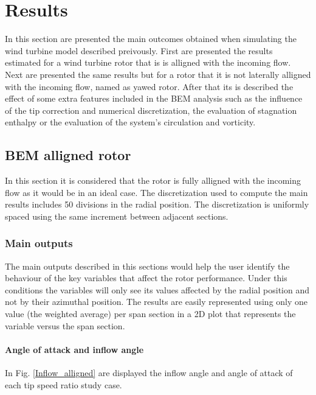 \chapter{Results}

In this section are presented the main outcomes obtained when simulating the wind turbine model described preivously.  First are presented the results estimated for a wind turbine rotor that is is alligned with the incoming flow. Next are presented the same results but for a rotor that it is not laterally alligned with the incoming flow, named as yawed rotor. After that its is described the effect of some extra features included in the BEM analysis such as the influence of the tip correction and numerical discretization, the evaluation of stagnation enthalpy or the evaluation of the system's circulation and vorticity.\\


\section{BEM alligned rotor}

In this section it is considered that the rotor is fully alligned with the incoming flow as it would be in an ideal case. The discretization used to compute the main results includes 50 divisions in the radial position. The discretization is uniformly spaced using the same increment between adjacent sections.  

\subsection{Main outputs }

The main outputs described in this sections would help the user identify the behaviour of the key variables that affect the rotor performance. Under this conditions the variables will only see its values affected by the radial position and not by their azimuthal position. The results are easily represented using only one value (the weighted average) per span section in a 2D plot that represents the variable versus the span section.  

\subsubsection{\textbf{Angle of attack and inflow angle}  }

In Fig. \ref{Inflow_alligned} are displayed the inflow angle and angle of attack of each tip speed ratio study case. 

